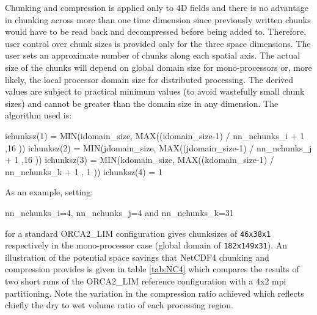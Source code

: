\documentclass[../main/NEMO_manual]{subfiles}
\begin{document}
Chunking and compression is applied only to 4D fields and
there is no advantage in chunking across more than one time dimension since
previously written chunks would have to be read back and decompressed before being added to.
Therefore, user control over chunk sizes is provided only for the three space dimensions.
The user sets an approximate number of chunks along each spatial axis.
The actual size of the chunks will depend on global domain size for mono-processors or, more likely,
the local processor domain size for distributed processing.
The derived values are subject to practical minimum values (to avoid wastefully small chunk sizes) and
cannot be greater than the domain size in any dimension.
The algorithm used is:

\begin{forlines}
ichunksz(1) = MIN(idomain_size, MAX((idomain_size-1) / nn_nchunks_i + 1 ,16 ))
ichunksz(2) = MIN(jdomain_size, MAX((jdomain_size-1) / nn_nchunks_j + 1 ,16 ))
ichunksz(3) = MIN(kdomain_size, MAX((kdomain_size-1) / nn_nchunks_k + 1 , 1 ))
ichunksz(4) = 1
\end{forlines}

\noindent As an example, setting:

\begin{forlines}
nn_nchunks_i=4, nn_nchunks_j=4 and nn_nchunks_k=31
\end{forlines}

\noindent for a standard ORCA2\_LIM configuration gives chunksizes of {\small\tt 46x38x1} respectively in
the mono-processor case (\ie global domain of {\small\tt 182x149x31}).
An illustration of the potential space savings that NetCDF4 chunking and compression provides is given in 
table \autoref{tab:NC4} which compares the results of two short runs of the ORCA2\_LIM reference configuration with
a 4x2 mpi partitioning.
Note the variation in the compression ratio achieved which reflects chiefly the dry to wet volume ratio of
each processing region.
\end{document}
